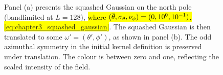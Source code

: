 \begin{figure}[htpb]
	\centering\capstart{}
	\hfill
	\caption[
		A squashed Gaussian on the north pole and then translated
	]{
		Panel (a) presents the squashed Gaussian on the north pole (bandlimited at \(L=128\)), \hl{where \mbox{\((\overline{\theta},\sigma_{\theta},\nu_{\phi}) = (0,10^{0},10^{-1})\)}, \cf{} \mbox{\cref{eq:chapter3_squashed_gaussian}}}.
		The squashed Gaussian is then translated to some \(\omega'=(\theta',\phi')\), as shown in panel (b).
		The odd azimuthal symmetry in the initial kernel definition is preserved under translation.
		The colour is between zero and one, reflecting the scaled intensity of the field.
	}\label{fig:chapter3_squashed_gaussian}
\end{figure}
